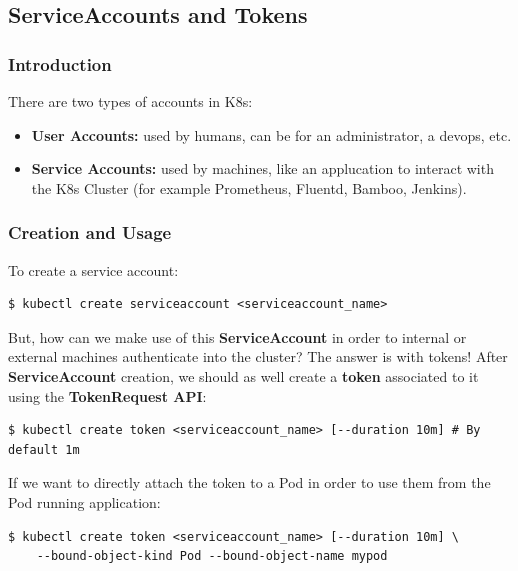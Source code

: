 \documentclass{article}
\newenvironment{codetemplate}[1][]{%
  \mybasecolorbox[#1]
  \itshape
}{%
  \endmybasecolorbox
}
\begin{document}
\subsection{ServiceAccounts and Tokens}
\subsubsection{Introduction}
There are two types of accounts in K8s:
\begin{itemize}
    \item \textbf{User Accounts:} used by humans, can be for an administrator, a devops, etc.
    \item \textbf{Service Accounts:} used by machines, like an applucation to interact with the K8s Cluster (for example Prometheus, Fluentd, Bamboo, Jenkins).
\end{itemize}

\subsubsection{Creation and Usage}
To create a service account:
\begin{codetemplate}{}
\begin{verbatim}
$ kubectl create serviceaccount <serviceaccount_name>
\end{verbatim}
\end{codetemplate}

But, how can we make use of this \textbf{ServiceAccount} in order to internal or external machines authenticate into the cluster? The answer is with tokens!
After \textbf{ServiceAccount} creation, we should as well create a \textbf{token} associated to it using the \textbf{TokenRequest API}:
\begin{codetemplate}{}
\begin{verbatim}
$ kubectl create token <serviceaccount_name> [--duration 10m] # By default 1m
\end{verbatim}
\end{codetemplate}

If we want to directly attach the token to a Pod in order to use them from the Pod running application:
\begin{codetemplate}{}
\begin{verbatim}
$ kubectl create token <serviceaccount_name> [--duration 10m] \
    --bound-object-kind Pod --bound-object-name mypod
\end{verbatim}
\end{codetemplate}
\end{document}

